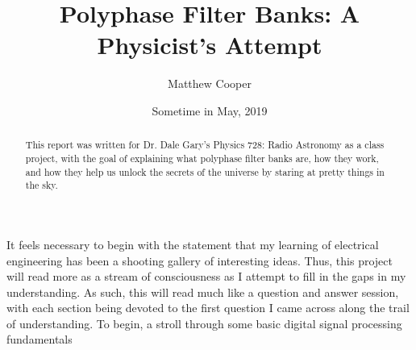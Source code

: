 \documentclass{article}
\title{Polyphase Filter Banks: A Physicist's Attempt}
\author{Matthew Cooper}
\date{Sometime in May, 2019}
\begin{document}
\maketitle
\begin{abstract}
This report was written for Dr. Dale Gary's Physics 728: Radio Astronomy as a class project, with the goal of explaining what polyphase filter banks are, how they work, and how they help us unlock the secrets of the universe by staring at pretty things in the sky.   
\end{abstract}

\newpage
It feels necessary to begin with the statement that my learning of electrical engineering has been a shooting gallery of interesting ideas.  Thus, this project will read more as a stream of consciousness as I attempt to fill in the gaps in my understanding.  As such, this will read much like a question and answer session, with each section being devoted to the first question I came across along the trail of understanding.  To begin, a stroll through some basic digital signal processing fundamentals    
\end{document}
